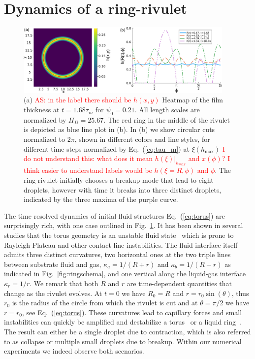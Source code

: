 \documentclass[twoside,twocolumn,9pt]{article}
\begin{document}
\section{Dynamics of a ring-rivulet}
\label{sec:dynamics}
\begin{figure}
    \centering
    \includegraphics[width=0.95\textwidth]{assets/heatcirc_2.png}
    \caption{(a) \textcolor{red}{AS: in the label 
    there should be $h(x,y)$} Heatmap of the film thickness at $t=1.68\tau_m$ for $\psi_0 = 0.21$. 
    All length scales are normalized by $H_D = 25.67$. 
    The red ring in the middle of the rivulet is depicted as blue line plot in (b).
    In (b) we show circular cuts normalized to $2\pi$, shown in different colors and line styles, for different time steps normalized by Eq.~(\ref{eq:tau_m}) at $\xi(h_{\max})$ \textcolor{red}{I do not understand this: what does it mean $h(\xi)|_{h_{max}}$ and $x(\phi)$? I think 
    easier to understand labels would be $h(\xi=R,\phi)$ 
    and $\phi$}.
    The ring-rivulet initially chooses a breakup mode that lead to eight droplets, however with time it breaks into three distinct droplets, indicated by the three maxima of the purple curve.}
    \label{fig:ThreeDToOneD}
\end{figure}
The time resolved dynamics of initial fluid structures Eq.~(\ref{eq:torus}) are surprisingly rich, with one case outlined in Fig.~\ref{fig:ThreeDToOneD}.
It has been shown in several studies that the torus geometry is an unstable fluid state~\cite{gonzalezStabilityLiquidRing2013, mehrabianCapillaryBreakupLiquid2013, edwardsControllingBreakupToroidal2021, wuBreakupPatternedNanoscale2010} which is prone to Rayleigh-Plateau and other contact line instabilities. 
The fluid interface itself admits three distinct curvatures, two horizontal ones at the two triple lines between substrate fluid and gas, $\kappa_a = 1/(R+r)$ and $\kappa_b = 1/(R-r)$ as indicated in Fig.~\ref{fig:ringschema}, and one vertical along the liquid-gas interface $\kappa_r = 1/r$.
We remark that both $R$ and $r$ are time-dependent quantities that change as the rivulet evolves.
At $t=0$ we have $R_0 = R$ and $r = r_0\sin(\theta)$, thus $r_0$ is the radius of the circle from which the rivulet is cut and at $\theta = \pi/2$ we have $r=r_0$, see Eq.~(\ref{eq:torus}).
These curvatures lead to capillary forces and small instabilities can quickly be amplified and destabilize a torus~\cite{mehrabianCapillaryBreakupLiquid2013} or a liquid ring~\cite{gonzalezStabilityLiquidRing2013}. 
The result can either be a single droplet due to contraction, which is also referred to as collapse or multiple small droplets due to breakup.
Within our numerical experiments we indeed observe both scenarios.
\end{document}
